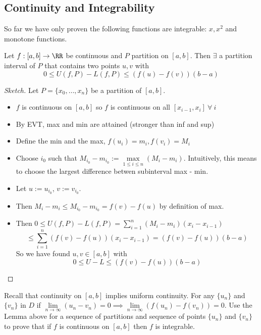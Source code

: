 \documentclass[12pt]{scrartcl}
\begin{document}
\subsection{Continuity and Integrability}

So far we have only proven the following functions are integrable: $x, x^2$ 
and monotone functions. 

\begin{lemma}
  Let $f: [a,b]\to\RR$ be continuous and $P$ partition on $[a,b]$. Then $\exists$ a partition interval of $P$ that contains two points $u, v$ with
  \[0 \leq U(f, P) - L(f, P) \leq (f(u) - f(v))(b-a)\] 

  \begin{proof}[Sketch]
  
  \hfill

  Let $P = \{x_0, \ldots, x_n\}$ be a partition of $[a,b]$. 
  \begin{itemize}
    \item $f$ is continuous on $[a,b]$ so $f$ is continuous on all $[x_{i-1}, x_i] \ \forall \ i$
    \item By EVT, max and min are attained (stronger than inf and sup)
    \item Define the min and the max, $f(u_i) = m_i, f(v_i) = M_i$
    \item Choose $i_0$ such that $M_{i_0} - m_{i_0} := \underset{1 \leq i \leq n}{\max}(M_i - m_i)$. Intuitively, 
    this means to choose the largest difference betwen subinterval max - min. 
    \item Let $u := u_{i_0}$, $v := v_{i_0}$. 
    \item Then $M_i - m_i \leq M_{i_0} - m_{i_0} = f(v) - f(u)$ by definition of max.
    \item Then $0 \leq U(f, P) - L(f, P) = \sum_{i=1}^n (M_i - m_i)(x_i - x_{i-1})$
    \[\leq \sum_{i=1}^n (f(v) - f(u))(x_i - x_{i-1}) = (f(v) - f(u))(b-a)\]
    So we have found $u, v \in [a,b]$ with 
    \[ 0 \leq U - L \leq (f(v) - f(u))(b-a)\]
  \end{itemize}

  \end{proof}
\end{lemma}

\begin{remark}
  Recall that continuity on $[a,b]$ implies uniform continuity. 
  For any $\{u_n\}$ and $\{v_n\}$ in $D$ if $\underset{n\to\infty}{\lim}(u_n - v_n) = 0 \implies \underset{n\to\infty}{\lim}(f(u_n) - f(v_n)) = 0$.
  Use the Lemma above for a sequence of partitions and sequence of points
  $\{u_n\}$ and $\{v_n\}$ to prove that if $f$ is continuous on $[a,b]$ then $f$ is integrable.

\end{remark}
\end{document}
